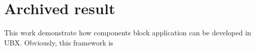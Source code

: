 \chapter{Archived result}
\label{ch:archived} 
This work demonstrate how components block application can be developed in UBX. Obviously, this framework is 
